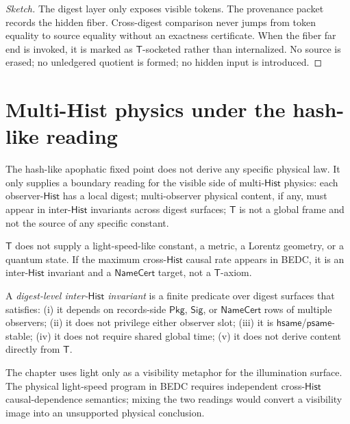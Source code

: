 \begin{proof}[Sketch]
The digest layer only exposes visible tokens. The provenance packet records the hidden fiber. Cross-digest comparison never jumps from token equality to source equality without an exactness certificate. When the fiber far end is invoked, it is marked as $\mathsf{T}$-socketed rather than internalized. No source is erased; no unledgered quotient is formed; no hidden input is introduced.
\end{proof}

\section{Multi-Hist physics under the hash-like reading}
\label{sec:hash-like-multihist-physics}

The hash-like apophatic fixed point does not derive any specific physical law. It only supplies a boundary reading for the visible side of multi-$\mathsf{Hist}$ physics: each observer-$\mathsf{Hist}$ has a local digest; multi-observer physical content, if any, must appear in inter-$\mathsf{Hist}$ invariants across digest surfaces; $\mathsf{T}$ is not a global frame and not the source of any specific constant.

\begin{principle}
\label{prin:hash-like-T-not-physical-constant}
$\mathsf{T}$ does not supply a light-speed-like constant, a metric, a Lorentz geometry, or a quantum state. If the maximum cross-$\mathsf{Hist}$ causal rate appears in BEDC, it is an inter-$\mathsf{Hist}$ invariant and a $\mathsf{NameCert}$ target, not a $\mathsf{T}$-axiom.
\end{principle}

\begin{definition}
\label{def:hash-like-digest-inter-hist-invariant}
A \emph{digest-level inter-$\mathsf{Hist}$ invariant} is a finite predicate over digest surfaces that satisfies: (i) it depends on records-side $\mathsf{Pkg}$, $\mathsf{Sig}$, or $\mathsf{NameCert}$ rows of multiple observers; (ii) it does not privilege either observer slot; (iii) it is $\mathsf{hsame}$/$\mathsf{psame}$-stable; (iv) it does not require shared global time; (v) it does not derive content directly from $\mathsf{T}$.
\end{definition}

\begin{remark}
\label{rem:hash-like-light-two-uses}
The chapter uses light only as a visibility metaphor for the illumination surface. The physical light-speed program in BEDC requires independent cross-$\mathsf{Hist}$ causal-dependence semantics; mixing the two readings would convert a visibility image into an unsupported physical conclusion.
\end{remark}


